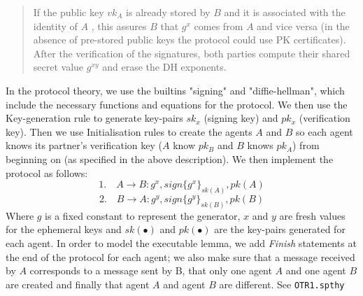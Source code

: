 \documentclass[a4paper,11pt]{scrartcl}
\begin{document}
\begin{quote}
If the public key $vk_A$ is already stored by $B$ and it is associated with the identity of $A$ , this assures $B$ that $g^x$ comes from $A$ and vice versa (in the absence of pre-stored public keys the protocol could use PK certificates). After the verification of the signatures, both parties compute their shared secret value $g^{xy}$ and erase the DH exponents.
\end{quote}
In the protocol theory, we use the builtins "signing" and
"diffie-hellman", which include the necessary functions and equations for the protocol. We then use the Key-generation rule to generate key-pairs $sk_x$ (signing key) and $pk_x$ (verification key). Then we use Initialisation rules to create the agents $A$ and $B$ so each agent knows its partner's verification key ($A$ know $pk_B$ and $B$ knows $pk_A$) from beginning on (as specified in the above description).
\newline
We then implement the protocol as follows:
\[ \text{1.} \quad A \rightarrow B: g^x, sign\{g^x\}_{sk(A)}, pk(A) \]
\[ \text{2.} \quad B \rightarrow A: g^y, sign\{g^y\}_{sk(B)}, pk(B) \]
Where $g$ is a fixed constant to represent the generator, $x$ and $y$ are fresh values for the ephemeral keys and
$ sk(\bullet)$ and $pk(\bullet)$ are the key-pairs generated for each agent.
\newline
In order to model the executable lemma, we add \emph{Finish} statements at the end of the protocol for each agent; we also make sure that a message received by $A$ corresponds to a message sent by B, that only one agent $A$ and one agent $B$ are created and finally that agent $A$ and agent $B$ are different.
\newline
See \texttt{OTR1.spthy}
\end{document}
